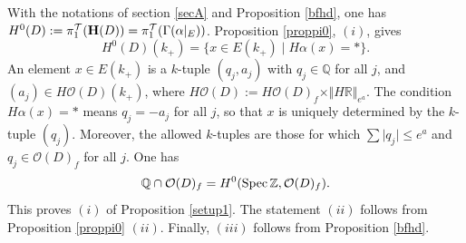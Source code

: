 \documentclass[cupthm]{CUP-JNL-JMJ}
\numberwithin{equation}{section}
\theoremstyle{cupplain}
\theoremstyle{cupdefinition}
\theoremstyle{cupremark}
\theoremstyle{cupproof}
\def\Q{{\mathbb Q}}
\def\R{{\mathbb R}}
\def\Z{{\mathbb Z}}
\def\cO{{\mathcal O}}
\def\cT{{\mathcal T}}
\def\bfh{{\bf H}}
\def\Spec{{\rm Spec\,}}
\def\pik{\pi^{\cT}}
\def\spz{{\Spec\Z}}
\begin{document}
\begin{appendix}
 With the notations of section \ref{secA} and Proposition \ref{bfhd}, one has $H^0(D):= \pik_1(\bfh(D))=\pik_1(\Gamma(\alpha\vert_E))$. Proposition \ref{proppi0}, $(i)$, gives 
 \[
 H^0(D)(k_+)=\{x\in E(k_+)\mid H\alpha(x)=*\}.
 \]
 An element $x\in E(k_+)$ is  a $k$-tuple $(q_j,a_j)$ with $q_j\in \Q$ for all $j$, and  $(a_j)\in H\cO(D)(k_+)$, where $H\cO(D):=H\cO(D)_f\times \Vert H\R\Vert_{e^a}$. The condition $H\alpha(x)=*$ means $q_j=-a_j$ for all $j$, so that $x$ is uniquely determined by the $k$-tuple $(q_j)$. Moreover, the allowed $k$-tuples are those for which   $\sum \vert q_j\vert \leq e^a$ and $q_j\in  \cO(D)_f$ for all $j$. One has  
 \[
 \Q\cap \cO(D)_f= H^0(\spz ,\cO(D)_f).
 \]
This proves $(i)$ of Proposition \ref{setup1}. The  statement $(ii)$ follows  from Proposition \ref{proppi0} $(ii)$.  Finally, $(iii)$ follows from Proposition \ref{bfhd}.

\vspace{.1in}


 






\end{appendix}
\end{document}
